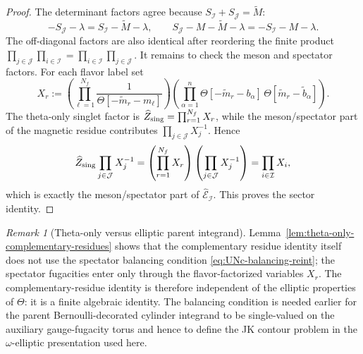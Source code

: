 \documentclass[11pt,a4paper]{article}
\numberwithin{equation}{section}
\theoremstyle{plain}
\theoremstyle{definition}
\theoremstyle{remark}
\newtheorem{remark}[theorem]{Remark}
\begin{document}
\begin{proof}
The determinant factors agree because \(S_{\mathcal I}+S_{\mathcal J}=\widetilde M\):
\begin{equation}
-S_{\mathcal J}-\lambda=S_{\mathcal I}-\widetilde M-\lambda,
\qquad
S_{\mathcal J}-M-\widetilde M-\lambda=-S_{\mathcal I}-M-\lambda .
\end{equation}
The off-diagonal factors are also identical after reordering the finite product
\(\prod_{j\in\mathcal J}\prod_{i\in\mathcal I}=\prod_{i\in\mathcal I}\prod_{j\in\mathcal J}\).
It remains to check the meson and spectator factors.  For each flavor label set
\begin{equation}
X_r:=
\left(\prod_{\ell=1}^{N_f}\frac{1}{\Theta[-\widetilde m_r-m_\ell]}\right)
\left(\prod_{\alpha=1}^{n}\Theta[-\widetilde m_r-b_\alpha]\,
\Theta[\widetilde m_r-\widetilde b_\alpha]\right).
\end{equation}
The theta-only singlet factor is \(\widehat Z_{\rm sing}=\prod_{r=1}^{N_f}X_r\), while the meson/spectator part of the magnetic residue contributes \(\prod_{j\in\mathcal J}X_j^{-1}\). Hence
\begin{equation}
\widehat Z_{\rm sing}\prod_{j\in\mathcal J}X_j^{-1}
=
\left(\prod_{r=1}^{N_f}X_r\right)
\left(\prod_{j\in\mathcal J}X_j^{-1}\right)
=
\prod_{i\in\mathcal I}X_i,
\end{equation}
which is exactly the meson/spectator part of \(\widehat{\mathcal E}_{\mathcal I}\).  This proves the sector identity.
\end{proof}

\begin{remark}[Theta-only versus elliptic parent integrand]
Lemma~\ref{lem:theta-only-complementary-residues} shows that the complementary residue identity itself does not use the spectator balancing condition \eqref{eq:UNc-balancing-reint}; the spectator fugacities enter only through the flavor-factorized variables \(X_r\).  The complementary-residue identity is therefore independent of the elliptic properties of \(\Theta\): it is a finite algebraic identity.  The balancing condition is needed earlier for the parent Bernoulli-decorated cylinder integrand to be single-valued on the auxiliary gauge-fugacity torus and hence to define the JK contour problem in the \(\omega\)-elliptic presentation used here.
\end{remark}
\end{document}
